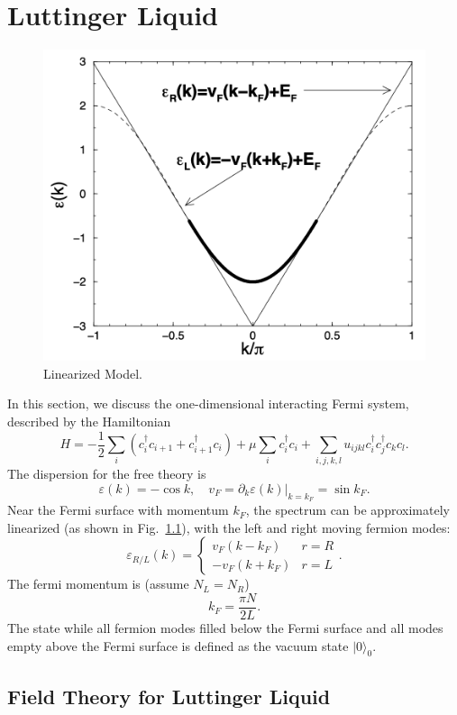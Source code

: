 \chapter{Luttinger Liquid}

\begin{figure}
	\centering
	\includegraphics[width=0.4\linewidth]{pics/LL-linearize.png}
	\caption{Linearized Model.}
	\label{fig:bs-linearize}
\end{figure}

In this section, we discuss the one-dimensional interacting Fermi system, described by the Hamiltonian
\begin{equation}
	H = -\frac{1}{2}\sum_{i} (c_i^\dagger c_{i+1} + c_{i+1}^\dagger c_i) + \mu\sum_i c_i^\dagger c_i + \sum_{i,j,k,l} u_{ijkl} c_i^\dagger c_j^\dagger c_k c_l.
\end{equation}
The dispersion for the free theory is 
\begin{equation}
	\varepsilon(k) = -\cos k, \quad 
	v_F = \partial_k \varepsilon(k)|_{k=k_F} = \sin k_F.
\end{equation}
Near the Fermi surface with momentum $k_F$, the spectrum can be approximately linearized (as shown in Fig.~\ref{fig:bs-linearize}), with the left and right moving fermion modes:
\begin{equation}
	\varepsilon_{R/L}(k) = \begin{cases}
		v_F (k - k_F) & r=R \\
		-v_F (k + k_F) & r=L
	\end{cases}.
\end{equation}
The fermi momentum is (assume $N_L=N_R$)
\begin{equation}
	k_F = \frac{\pi N}{2L}.
\end{equation}
The state while all fermion modes filled below the Fermi surface and all modes empty above the Fermi surface is defined as the vacuum state $|0\rangle_0$.



\section{Field Theory for Luttinger Liquid}

